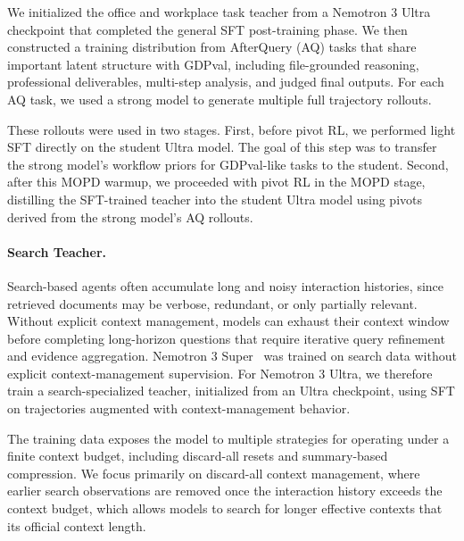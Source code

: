 We initialized the office and workplace task teacher from a Nemotron 3 Ultra checkpoint that completed the general SFT post-training phase. We then constructed a training distribution from AfterQuery (AQ) tasks that share important latent structure with GDPval, including file-grounded reasoning, professional deliverables, multi-step analysis, and judged final outputs. For each AQ task, we used a strong model to generate multiple full trajectory rollouts.

These rollouts were used in two stages. First, before pivot RL, we performed light SFT directly on the student Ultra model. The goal of this step was to transfer the strong model’s workflow priors for GDPval-like tasks to the student. Second, after this MOPD warmup, we proceeded with pivot RL in the MOPD stage, distilling the SFT-trained teacher into the student Ultra model using pivots derived from the strong model’s AQ rollouts.



\paragraph{Search Teacher.} 
Search-based agents often accumulate long and noisy interaction histories, since retrieved documents may be verbose, redundant, or only partially relevant. Without explicit context management, models can exhaust their context window before completing long-horizon questions that require iterative query refinement and evidence aggregation. Nemotron 3 Super~\citep{nvidia2026nemotron3superopen} was trained on search data without explicit context-management supervision. For Nemotron 3 Ultra, we therefore train a search-specialized teacher, initialized from an Ultra checkpoint, using SFT on trajectories augmented with context-management behavior.

The training data exposes the model to multiple strategies for operating under a finite context budget, including discard-all resets and summary-based compression. We focus primarily on discard-all context management, where earlier search observations are removed once the interaction history exceeds the context budget, which allows models to search for longer effective contexts that its official context length.


